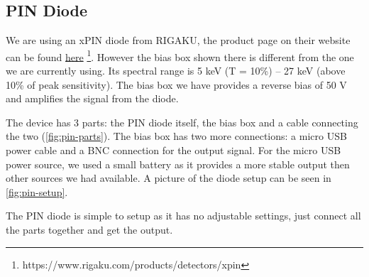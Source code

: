 \documentclass[a4paper, 10pt]{article}
\begin{document}
\subsection{PIN Diode}
We are using an xPIN diode from RIGAKU, the product page on their website can be found \href{https://www.rigaku.com/products/detectors/xpin}{here} \footnote{https://www.rigaku.com/products/detectors/xpin}.
However the bias box shown there is different from the one we are currently using.
Its spectral range is 5 \si{\kilo\electronvolt} (T = 10\%) – 27 \si{\kilo\electronvolt} (above 10\% of peak sensitivity).
The bias box we have provides a reverse bias of 50 \si{\volt} and amplifies the signal from the diode.

The device has 3 parts: the PIN diode itself, the bias box and a cable connecting the two (\cref{fig:pin-parts}).
The bias box has two more connections: a micro USB power cable and a BNC connection for the output signal.
For the micro USB power source, we used a small battery as it provides a more stable output then other sources we had available.
A picture of the diode setup can be seen in \cref{fig:pin-setup}.

The PIN diode is simple to setup as it has no adjustable settings, just connect all the parts together and get the output.
\end{document}
